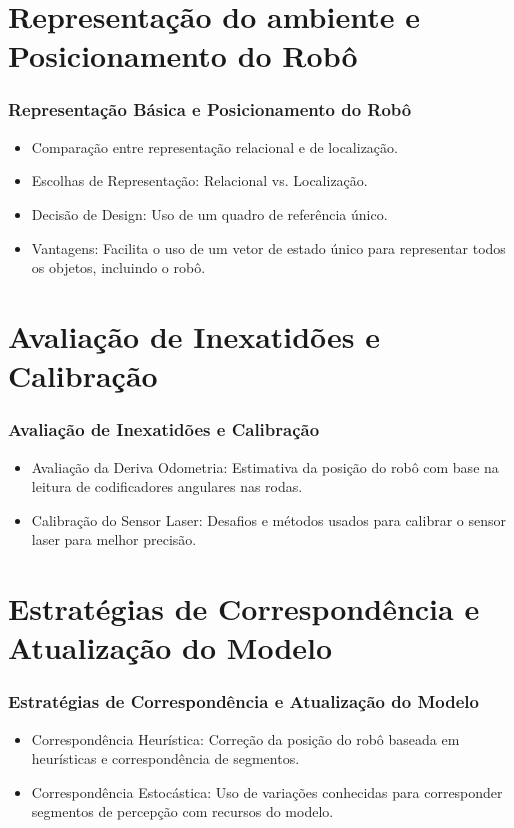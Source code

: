 \documentclass[xcolor=dvipsnames, aspectratio=169]{beamer}
\begin{document}
\section{Representação do ambiente e Posicionamento do Robô}
  \begin{frame}
  \frametitle{Representação Básica e Posicionamento do Robô}
  \begin{itemize}
      \item Comparação entre representação relacional e de localização.
      \item Escolhas de Representação: Relacional vs. Localização.
      \item Decisão de Design: Uso de um quadro de referência único.
      \item Vantagens: Facilita o uso de um vetor de estado único para representar todos os objetos, incluindo o robô.
  \end{itemize}
  \end{frame}
  

\section{Avaliação de Inexatidões e Calibração}
  \begin{frame}
  \frametitle{Avaliação de Inexatidões e Calibração}
  \begin{itemize}
      \item Avaliação da Deriva Odometria: Estimativa da posição do robô com base na leitura de codificadores angulares nas rodas.
      \item Calibração do Sensor Laser: Desafios e métodos usados para calibrar o sensor laser para melhor precisão.
  \end{itemize}
  \end{frame}
  

\section{Estratégias de Correspondência e Atualização do Modelo}
  \begin{frame}
  \frametitle{Estratégias de Correspondência e Atualização do Modelo}
  \begin{itemize}
      \item Correspondência Heurística: Correção da posição do robô baseada em heurísticas e correspondência de segmentos.
      \item Correspondência Estocástica: Uso de variações conhecidas para corresponder segmentos de percepção com recursos do modelo.
  \end{itemize}
  \end{frame}
  
\end{document}
